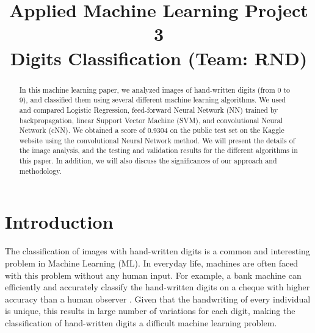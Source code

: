 \documentclass[conference]{IEEEtran}
\begin{document}
\title{Applied Machine Learning Project 3 \\ Digits Classification (Team: RND)}

\author{
\and
{}
\and
{}
}

\maketitle

\begin{abstract}
In this machine learning paper, we analyzed images of hand-written digits (from 0 to 9), and classified them using several different machine learning algorithms. We used and compared Logistic Regression, feed-forward Neural Network (NN) trained by backpropagation, linear Support Vector Machine (SVM), and convolutional Neural Network (cNN). We obtained a score of 0.9304 on the public test set on the Kaggle website using the convolutional Neural Network method. We will present the details of the image analysis, and the testing and validation results for the different algorithms in this paper. In addition, we will also discuss the significances of our approach and methodology.
\end{abstract}

\IEEEpeerreviewmaketitle

\section{Introduction}
The classification of images with hand-written digits is a common and interesting problem in Machine Learning (ML). In everyday life, machines are often faced with this problem without any human input. For example, a bank machine can efficiently and accurately classify the hand-written digits on a cheque with higher accuracy than a human observer \cite{lecun-98, Schmidhuber:2012:MDN:2354409.2354694}. Given that the handwriting of every individual is unique, this results in large number of variations for each digit, making the classification of hand-written digits a difficult machine learning problem.
\end{document}
